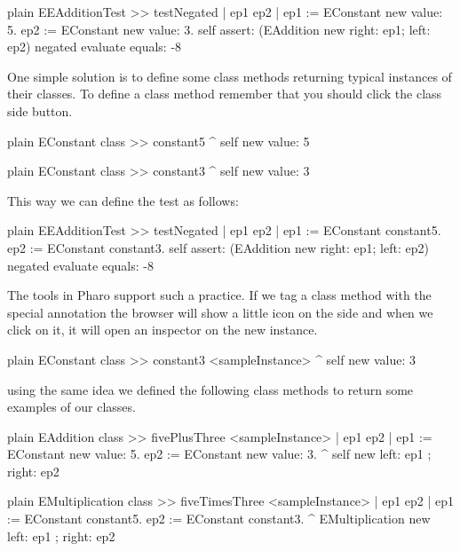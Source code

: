 \documentclass[10pt,twoside,english]{_support/latex/sbabook/sbabook}
\begin{document}
\begin{displaycode}{plain}
EEAdditionTest >> testNegated
	| ep1 ep2 |
	ep1 := EConstant new value: 5.
	ep2 := EConstant new value: 3.
	self assert: (EAddition new right: ep1; left: ep2) negated evaluate equals: -8
\end{displaycode}

One simple solution is to define some class methods returning typical instances of their classes. To define a class method remember that you should click the class side button. 

\begin{displaycode}{plain}
EConstant class >> constant5
	^ self new value: 5
\end{displaycode}

\begin{displaycode}{plain}
EConstant class >> constant3
	^ self new value: 3
\end{displaycode}

This way we can define the test as follows:

\begin{displaycode}{plain}
EEAdditionTest >> testNegated
	| ep1 ep2 |
	ep1 := EConstant constant5.
	ep2 := EConstant constant3.
	self assert: (EAddition new right: ep1; left: ep2) negated evaluate equals: -8
\end{displaycode}

The tools in Pharo support such a practice. If we tag a class method with the special annotation  the browser will show a little icon on the side and when we click on it, it will open an inspector on the new instance. 

\begin{displaycode}{plain}
EConstant class >> constant3
	<sampleInstance>
	^ self new value: 3
\end{displaycode}

using the same idea we defined the following class methods to return some examples of our classes.

\begin{displaycode}{plain}
EAddition class >> fivePlusThree
	<sampleInstance>
	| ep1 ep2 |
	ep1 := EConstant new value: 5.
	ep2 := EConstant new value: 3.
	^ self new left: ep1 ; right: ep2 
\end{displaycode}

\begin{displaycode}{plain}
EMultiplication class >> fiveTimesThree
	<sampleInstance>
	| ep1 ep2 |
	ep1 := EConstant constant5.
	ep2 := EConstant constant3.
   ^ EMultiplication new left: ep1 ; right: ep2 
\end{displaycode}
\end{document}
